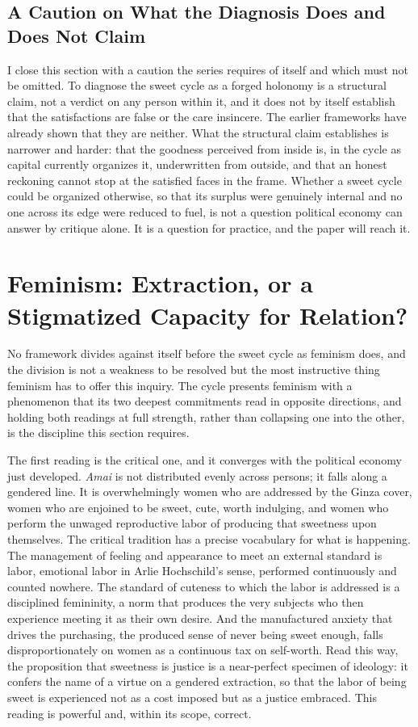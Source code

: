 \subsection{A Caution on What the Diagnosis Does and Does Not Claim}

I close this section with a caution the series requires of itself and which must not be omitted. To diagnose the sweet cycle as a forged holonomy is a structural claim, not a verdict on any person within it, and it does not by itself establish that the satisfactions are false or the care insincere. The earlier frameworks have already shown that they are neither. What the structural claim establishes is narrower and harder: that the goodness perceived from inside is, in the cycle as capital currently organizes it, underwritten from outside, and that an honest reckoning cannot stop at the satisfied faces in the frame. Whether a sweet cycle could be organized otherwise, so that its surplus were genuinely internal and no one across its edge were reduced to fuel, is not a question political economy can answer by critique alone. It is a question for practice, and the paper will reach it.

\section{Feminism: Extraction, or a Stigmatized Capacity for Relation?}

No framework divides against itself before the sweet cycle as feminism does, and the division is not a weakness to be resolved but the most instructive thing feminism has to offer this inquiry. The cycle presents feminism with a phenomenon that its two deepest commitments read in opposite directions, and holding both readings at full strength, rather than collapsing one into the other, is the discipline this section requires.

The first reading is the critical one, and it converges with the political economy just developed. \textit{Amai} is not distributed evenly across persons; it falls along a gendered line. It is overwhelmingly women who are addressed by the Ginza cover, women who are enjoined to be sweet, cute, worth indulging, and women who perform the unwaged reproductive labor of producing that sweetness upon themselves. The critical tradition has a precise vocabulary for what is happening. The management of feeling and appearance to meet an external standard is labor, emotional labor in Arlie Hochschild's sense, performed continuously and counted nowhere. The standard of cuteness to which the labor is addressed is a disciplined femininity, a norm that produces the very subjects who then experience meeting it as their own desire. And the manufactured anxiety that drives the purchasing, the produced sense of never being sweet enough, falls disproportionately on women as a continuous tax on self-worth. Read this way, the proposition that sweetness is justice is a near-perfect specimen of ideology: it confers the name of a virtue on a gendered extraction, so that the labor of being sweet is experienced not as a cost imposed but as a justice embraced. This reading is powerful and, within its scope, correct.

